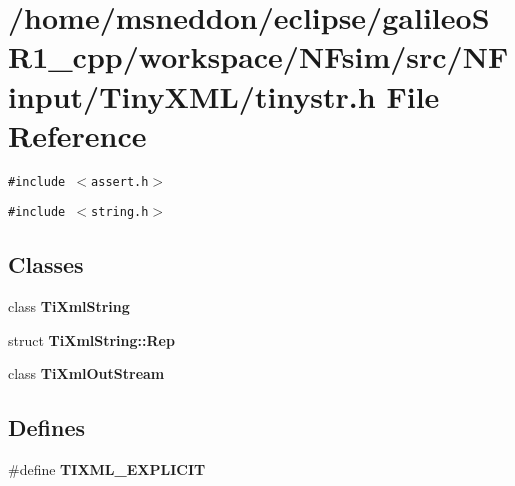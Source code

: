 \section{/home/msneddon/eclipse/galileoSR1\_\-cpp/workspace/NFsim/src/NFinput/TinyXML/tinystr.h File Reference}
\label{tinystr_8h}


{\tt \#include $<$assert.h$>$}\par
{\tt \#include $<$string.h$>$}\par
\subsection*{Classes}
\begin{CompactItemize}
\item 
class {\bf TiXmlString}
\item 
struct \textbf{TiXmlString::Rep}
\item 
class {\bf TiXmlOutStream}
\end{CompactItemize}
\subsection*{Defines}
\begin{CompactItemize}
\item 
\#define {\bf TIXML\_\-EXPLICIT}
\end{CompactItemize}
